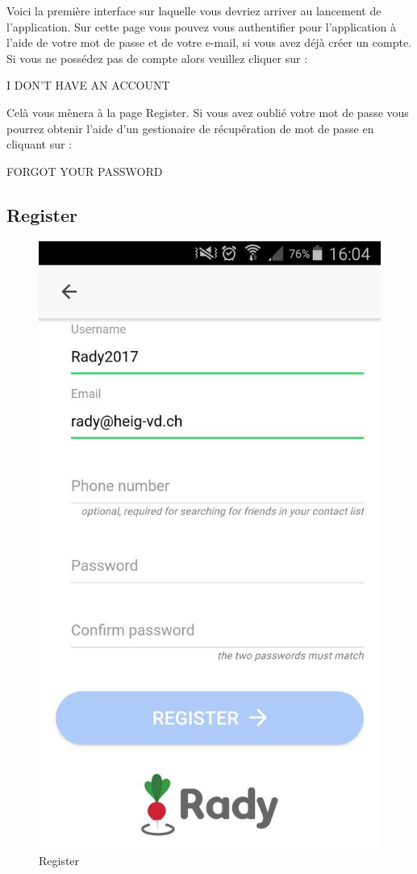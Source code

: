 \documentclass[french]{article}
\begin{document}
	Voici la première interface sur laquelle vous devriez arriver au lancement de l'application. Sur cette page vous pouvez vous authentifier pour l'application à l'aide de votre mot de passe et de votre e-mail, si vous avez déjà créer un compte. Si vous ne possédez pas de compte alors veuillez cliquer sur :
	\bigskip
	
	\centering
	I DON'T HAVE AN ACCOUNT
	
	\bigskip
	\justifying 
	Celà vous mènera à la page Register.
	\newline
	Si vous avez oublié votre mot de passe vous pourrez obtenir l'aide d'un gestionaire de récupération de mot de passe en cliquant sur :
	\bigskip
	
	\centering
	FORGOT YOUR PASSWORD
	
	\bigskip
	\justifying 
	\subsection{Register}
	\begin{figure}[H]
		\centering
		\includegraphics[scale=0.4]{../screenshot/screenshot-register2}
		\caption{Register}
		\label{Register}
	\end{figure} 
\end{document}
